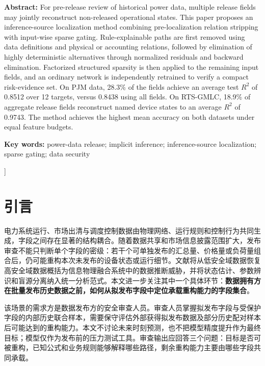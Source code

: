 \documentclass[UTF8,zihao=5,twoside,fontset=none]{ctexart}
\begin{document}
\noindent\textbf{Abstract:} For pre-release review of historical power data, multiple release fields may jointly reconstruct non-released operational states. This paper proposes an inference-source localization method combining pre-localization relation stripping with input-wise sparse gating. Rule-explainable paths are first removed using data definitions and physical or accounting relations, followed by elimination of highly deterministic alternatives through normalized residuals and backward elimination. Factorized structured sparsity is then applied to the remaining input fields, and an ordinary network is independently retrained to verify a compact risk-evidence set. On PJM data, 28.3\% of the fields achieve an average test $R^2$ of 0.8512 over 12 targets, versus 0.8438 using all fields. On RTS-GMLC, 18.9\% of aggregate release fields reconstruct named device states to an average $R^2$ of 0.9743. The method achieves the highest mean accuracy on both datasets under equal feature budgets.\par
\noindent\textbf{Key words:} power-data release; implicit inference; inference-source localization; sparse gating; data security\par\vspace{0.8em}

\vspace{0.3em}
]

\section{引言}

电力系统运行、市场出清与调度控制数据由物理网络、运行规则和控制行为共同生成，字段之间存在显著的结构耦合。随着数据共享和市场信息披露范围扩大，发布审查不能只判断单个字段的密级：若干个可单独发布的汇总量、价格量或负荷量组合后，仍可能重构本次未发布的设备状态或运行细节。文献\cite{ref-liu-data-inference}将从低安全域数据恢复高安全域数据概括为信息物理融合系统中的数据推断威胁，并将状态估计、参数辨识和盲源分离纳入统一分析范式。本文进一步关注其中一个具体环节：\textbf{数据拥有方在批量发布历史数据之前，如何从拟发布字段中定位承载重构能力的字段集合}。

该场景的需求方是数据发布方的安全审查人员。审查人员掌握拟发布字段与受保护字段的内部历史联合样本，需要保守评估外部获得拟发布数据及部分历史配对样本后可能达到的重构能力。本文不讨论未来时刻预测，也不把模型精度提升作为最终目标；模型仅作为发布前的压力测试工具。审查输出应回答三个问题：目标是否可被重构，已知公式和业务规则能够解释哪些路径，剩余重构能力主要由哪些字段共同承载。
\end{document}

